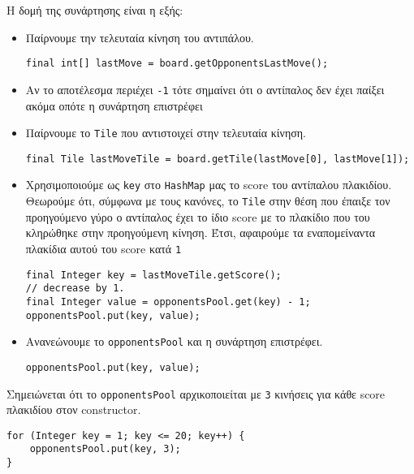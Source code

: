 Η δομή της συνάρτησης είναι η εξής:
\begin{itemize}
\item Παίρνουμε την τελευταία κίνηση του αντιπάλου.
\begin{lstlisting}[breaklines=true, numbers=none, aboveskip=\smallskipamount, belowskip=\smallskipamount, captionpos=none]
final int[] lastMove = board.getOpponentsLastMove();
\end{lstlisting}

\item Αν το αποτέλεσμα περιέχει \lstinline!-1! τότε σημαίνει ότι ο αντίπαλος δεν έχει παίξει ακόμα οπότε η συνάρτηση επιστρέφει

\item Παίρνουμε το \lstinline!Tile! που αντιστοιχεί στην τελευταία κίνηση.
\begin{lstlisting}[breaklines=true, numbers=none, aboveskip=\smallskipamount, belowskip=\smallskipamount, captionpos=none]
final Tile lastMoveTile = board.getTile(lastMove[0], lastMove[1]);
\end{lstlisting}

\item Χρησιμοποιούμε ως \lstinline!key! στο \lstinline!HashMap! μας το score του αντίπαλου πλακιδίου.
Θεωρούμε ότι, σύμφωνα με τους κανόνες, το \lstinline!Tile! στην θέση που έπαιξε τον προηγούμενο γύρο ο αντίπαλος έχει το ίδιο score με το πλακίδιο που του κληρώθηκε στην προηγούμενη κίνηση.
Έτσι, αφαιρούμε τα εναπομείναντα πλακίδια αυτού του score κατά \lstinline!1!
\begin{lstlisting}[breaklines=true, numbers=none, aboveskip=\smallskipamount, belowskip=\smallskipamount, captionpos=none]
final Integer key = lastMoveTile.getScore();
// decrease by 1.
final Integer value = opponentsPool.get(key) - 1;
opponentsPool.put(key, value);
\end{lstlisting}

\item Ανανεώνουμε το \lstinline!opponentsPool! και η συνάρτηση επιστρέφει.
\begin{lstlisting}[breaklines=true, numbers=none, aboveskip=\smallskipamount, belowskip=\smallskipamount, captionpos=none]
opponentsPool.put(key, value);
\end{lstlisting}
\end{itemize}

Σημειώνεται ότι το \lstinline!opponentsPool! αρχικοποιείται με \lstinline!3! κινήσεις για κάθε score πλακιδίου στον constructor.
\begin{lstlisting}[breaklines=true, numbers=none, aboveskip=\smallskipamount, belowskip=\smallskipamount, captionpos=none]
for (Integer key = 1; key <= 20; key++) {
    opponentsPool.put(key, 3);
}
\end{lstlisting}